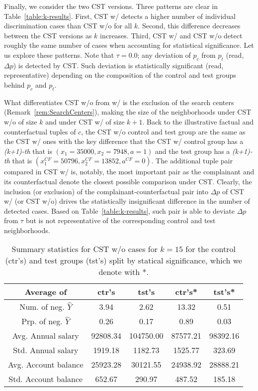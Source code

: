 Finally, we consider the two CST versions.
Three patterns are clear in Table~\ref{table:k-results}.
First, CST w/ detects a higher number of individual discrimination cases than CST w/o for all $k$.
Second, this difference decreases between the CST versions as $k$ increases.
Third, CST w/ and CST w/o detect roughly the same number of cases when accounting for statistical significance.
Let us explore these patterns.
Note that $\tau = 0.0$; any deviation of $p_c$ from $p_t$ (read, $\Delta p$) is detected by CST. 
Such deviation is statistically significant (read, representative) depending on the composition of the control and test groups behind $p_c$ and $p_t$. 

What differentiates CST w/o from w/ is the exclusion of the search centers (Remark~\ref{rem:SearchCenters}), making the size of the neighborhoods under CST w/o of size $k$ and under CST w/ of size $k+1$. 
Back to the illustrative factual and counterfactual tuples of $c$, the CST w/o control and test group are the same as the CST w/ ones with the key difference that the CST w/ control group has a \textit{(k+1)-th} that is $(x_1=35000, x_2=7948, a=1)$ and the test group has a \textit{(k+1)-th} that is $(x_1^{CF}=50796, x_2^{CF}=13852, a^{CF}=0)$.
The additional tuple pair compared in CST w/ is, notably, the most important pair
as the complainant and its counterfactual denote the closest possible comparison under CST.
Clearly, the inclusion (or exclusion) of the complainant-counterfactual pair into $\Delta p$ of CST w/ (or CST w/o) drives the statistically insignificant difference in the number of detected cases. 
Based on Table~\ref{table:k-results}, such pair is able to deviate $\Delta p$ from $\tau$ but is not representative of the corresponding control and test neighborhoods. 

%
\begin{table}[t]
\caption{Summary statistics for CST w/o cases for $k=15$ for the control (ctr’s) and test groups (tst’s) split by statical significance, which we denote with *.}
  \label{table:CST_without_k15}
  \centering
  \begin{tabular}{ccccc}
    \toprule
    Average of & ctr's & tst's & ctr's* & tst's* \\
    \midrule
    Num. of neg. $\hat{Y}$ & 3.94 & 2.62 & 13.32 & 0.51 \\
    Prp. of neg. $\hat{Y}$ & 0.26 & 0.17 & 0.89 & 0.03 \\
    Avg. Annual salary & 92808.34 & 104750.00 & 87577.21 & 98392.16 \\
    Std. Annual salary & 1919.18 & 1182.73 & 1525.77 & 323.69 \\
    Avg. Account balance & 25923.28 & 30121.55 & 24938.92 & 28888.21 \\
    Std. Account balance & 652.67 & 290.97 & 487.52 & 185.18 \\
    \bottomrule
  \end{tabular}
\end{table}
%

